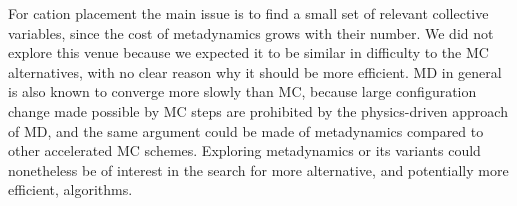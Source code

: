 \documentclass[main.tex]{subfiles}
\begin{document}
For cation placement the main issue is to find a small set of relevant collective variables, since the cost of metadynamics grows with their number. We did not explore this venue because we expected it to be similar in difficulty to the MC alternatives, with no clear reason why it should be more efficient. MD in general is also known to converge more slowly than MC, because large configuration change made possible by MC steps are prohibited by the physics-driven approach of MD, and the same argument could be made of metadynamics compared to other accelerated MC schemes. Exploring metadynamics or its variants could nonetheless be of interest in the search for more alternative, and potentially more efficient, algorithms.

\OnlyInSubfile{\printglobalbibliography}
\end{document}
